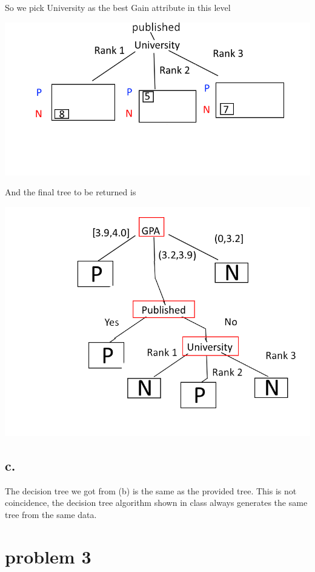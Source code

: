 \documentclass[12pt, letterpaper]{article}
\begin{document}
	So we pick University as the best Gain attribute in this level
	
	\includegraphics[scale=0.8]{"problem-2-step3"}
	
	
	And the final tree to be returned is
	
	\includegraphics[scale=0.6]{"problem-2-final"}
	
	\subsection{c.}
	
	The decision tree we got from (b) is the same as the provided tree.
	This is not coincidence, the decision tree algorithm shown in class always generates the same tree from the same data.
	
	\pagebreak
	\section{problem 3}
	
\end{document}
